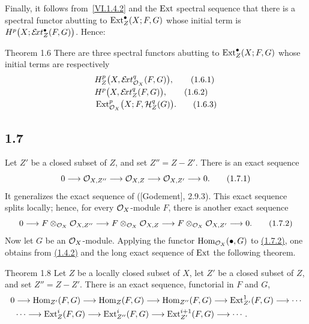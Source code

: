 Finally, it follows from~\eqref{VI.1.4.2} and the $\operatorname{Ext}$ spectral sequence
that there is a spectral functor abutting to $\operatorname{Ext}_Z^{\bullet}(X;F,G)$ whose
initial term is $H^p\bigl(X;\mathcal E\!xt_Z^{\bullet}(F,G)\bigr)$. Hence:

\begin{sgastatement}{Theorem 1.6}
There are three spectral functors abutting to
$\operatorname{Ext}_Z^{\bullet}(X;F,G)$ whose initial terms are respectively
\begin{align}
 &H_Z^p\bigl(X,\mathcal E\!xt_{\mathcal O_X}^q(F,G)\bigr),
   \tag{1.6.1}\label{VI.1.6.1}\\[-0.15em]
 &H^p\bigl(X,\mathcal E\!xt_Z^q(F,G)\bigr),
   \tag{1.6.2}\label{VI.1.6.2}\\[-0.15em]
 &\operatorname{Ext}_{\mathcal O_X}^p\bigl(X;F,\mathcal H_Z^q(G)\bigr).
   \tag{1.6.3}\label{VI.1.6.3}
\end{align}
\end{sgastatement}

\subsection*{1.7}
Let $Z'$ be a closed subset of $Z$, and set $Z''=Z-Z'$. There is an exact
sequence
\begin{equation}
 0\longrightarrow \mathcal O_{X,Z''}\longrightarrow \mathcal O_{X,Z}
 \longrightarrow \mathcal O_{X,Z'}\longrightarrow 0.
 \tag{1.7.1}\label{VI.1.7.1}
\end{equation}
It generalizes the exact sequence of \textup{([Godement], 2.9.3)}. This exact
sequence splits locally; hence, for every $\mathcal O_X$-module $F$, there is another
exact sequence
\begin{equation}
 0\longrightarrow F\otimes_{\mathcal O_X}\mathcal O_{X,Z''}
 \longrightarrow F\otimes_{\mathcal O_X}\mathcal O_{X,Z}
 \longrightarrow F\otimes_{\mathcal O_X}\mathcal O_{X,Z'}\longrightarrow 0.
 \tag{1.7.2}\label{VI.1.7.2}
\end{equation}
Now let $G$ be an $\mathcal O_X$-module. Applying the functor
$\operatorname{Hom}_{\mathcal O_X}(\mathbin{\bullet},G)$ to \hyperref[VI.1.7.2]{(1.7.2)}, one obtains from \hyperref[VI.1.4.2]{(1.4.2)} and
the long exact sequence of $\operatorname{Ext}$ the following theorem.

\begin{sgastatement}{Theorem 1.8}
Let $Z$ be a locally closed subset of $X$, let $Z'$ be a closed subset of
$Z$, and set $Z''=Z-Z'$. There is an exact sequence, functorial in $F$ and
$G$,
\[
\begin{aligned}
 0&\longrightarrow \operatorname{Hom}_{Z'}(F,G)\longrightarrow \operatorname{Hom}_Z(F,G)
 \longrightarrow \operatorname{Hom}_{Z''}(F,G)\longrightarrow \operatorname{Ext}_{Z'}^1(F,G)
 \longrightarrow\cdots \\
 &\cdots\longrightarrow \operatorname{Ext}_Z^i(F,G)\longrightarrow \operatorname{Ext}_{Z''}^i(F,G)
 \longrightarrow \operatorname{Ext}_{Z'}^{i+1}(F,G)\longrightarrow\cdots .
\end{aligned}
\]
\end{sgastatement}

